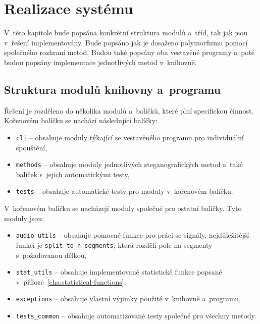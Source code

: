 \chapter{Realizace systému}
\label{cha:implementation}

V~této kapitole bude popsána konkrétní struktura modulů a~tříd, tak jak jsou
v~řešení implementovány. Bude popsáno jak je dosaženo polymorfizmu pomocí
společného rozhraní metod. Budou také popsány oba vestavěné programy a~poté
budou popsány implementace jednotlivých metod v~knihovně.

\section{Struktura modulů knihovny a~programu}
\label{sec:modules}

Řešení je rozděleno do několika modulů a~balíčků, které plní specifickou
činnost. Kořenovém balíčku se nachází následující balíčky:

\begin{itemize}
    \item \texttt{cli} -- obsahuje moduly týkající se vestavěného programu pro
        individuální spouštění,
    \item \texttt{methods} -- obsahuje moduly jednotlivých steganografických
        metod a~také balíček s~jejich automatickými testy,
    \item \texttt{tests} -- obsahuje automatické testy pro moduly v~kořenovém
        balíčku.
\end{itemize}

V~kořenovém balíčku se nacházejí moduly společné pro ostatní balíčky. Tyto
moduly jsou:

\begin{itemize}
    \item \texttt{audio\_utils} -- obsahuje pomocné funkce pro práci se signály,
        nejdůležitější funkcí je \texttt{split\_to\_n\_segments}, která rozdělí
        pole na segmenty s~požadovanou délkou,
    \item \texttt{stat\_utils} -- obsahuje implementované statistické funkce
        popsané v~příloze~\ref{cha:statistical-functions},
    \item \texttt{exceptions} -- obsahuje vlastní výjimky použité v~knihovně
        a~programu,
    \item \texttt{tests\_common} -- obsahuje automatizované testy společné pro
        všechny metody.
\end{itemize}

